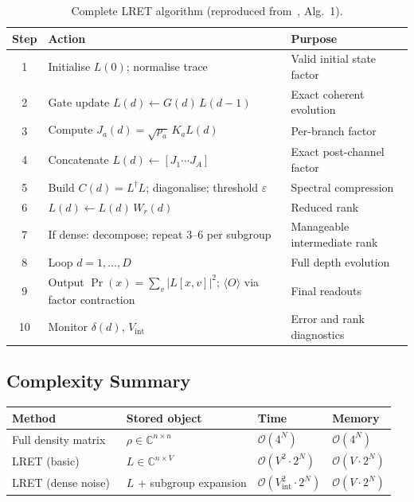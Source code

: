 \documentclass[11pt,a4paper]{article}
\begin{document}
\begin{table}[h]
\centering
\renewcommand{\arraystretch}{1.2}
\caption{Complete LRET algorithm (reproduced from~\cite{chen2021lret}, Alg.\ 1).}
\label{tab:lret-algo}
\begin{tabular}{@{}cll@{}}
\toprule
\textbf{Step} & \textbf{Action} & \textbf{Purpose} \\
\midrule
1  & Initialise $L(0)$; normalise trace             & Valid initial state factor \\
2  & Gate update $L(d) \leftarrow G(d)\,L(d-1)$     & Exact coherent evolution \\
3  & Compute $J_a(d) = \sqrt{p_a}\,K_a L(d)$         & Per-branch factor \\
4  & Concatenate $L(d) \leftarrow [J_1\cdots J_A]$   & Exact post-channel factor \\
5  & Build $C(d)=L^\dagger L$; diagonalise; threshold $\varepsilon$ & Spectral compression \\
6  & $L(d) \leftarrow L(d)\,W_r(d)$                   & Reduced rank \\
7  & If dense: decompose; repeat 3--6 per subgroup    & Manageable intermediate rank \\
8  & Loop $d = 1, \ldots, D$                          & Full depth evolution \\
9  & Output $\Pr(x) = \sum_v |L[x,v]|^2$; $\langle O\rangle$ via factor contraction & Final readouts \\
10 & Monitor $\delta(d)$, $V_{\mathrm{int}}$          & Error and rank diagnostics \\
\bottomrule
\end{tabular}
\end{table}

\subsection{Complexity Summary}

\begin{center}
\renewcommand{\arraystretch}{1.2}
\begin{tabular}{@{}llll@{}}
\toprule
\textbf{Method} & \textbf{Stored object} & \textbf{Time} & \textbf{Memory} \\
\midrule
Full density matrix     & $\rho \in \mathbb{C}^{n \times n}$ & $\mathcal{O}(4^N)$ & $\mathcal{O}(4^N)$ \\
LRET (basic)~\cite{chen2021lret} & $L \in \mathbb{C}^{n \times V}$ & $\mathcal{O}(V^2 \cdot 2^N)$ & $\mathcal{O}(V \cdot 2^N)$ \\
LRET (dense noise)~\cite{chen2021lret} & $L$ + subgroup expansion & $\mathcal{O}(V_\mathrm{int}^2 \cdot 2^N)$ & $\mathcal{O}(V \cdot 2^N)$ \\
\bottomrule
\end{tabular}
\end{center}
\end{document}
